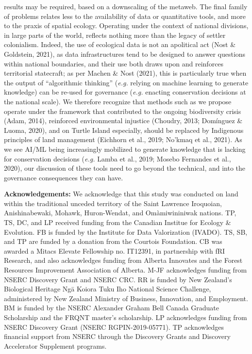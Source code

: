 \documentclass[10pt,oneside]{article}
\begin{document}
results may be required, based on a downscaling of the metaweb. The
final family of problems relates less to the availability of data or
quantitative tools, and more to the praxis of spatial ecology. Operating
under the context of national divisions, in large parts of the world,
reflects nothing more than the legacy of settler colonialism. Indeed,
the use of ecological data is not an apolitical act (Nost \& Goldstein,
2021), as data infrastructures tend to be designed to answer questions
within national boundaries, and their use both draws upon and reinforces
territorial statecraft; as per Machen \& Nost (2021), this is
particularly true when the output of ``algorithmic thinking''
(\emph{e.g.} relying on machine learning to generate knowledge) can be
re-used for governance (\emph{e.g.} enacting conservation decisions at
the national scale). We therefore recognize that methods such as we
propose operate under the framework that contributed to the ongoing
biodiversity crisis (Adam, 2014), reinforced environmental injustice
(Choudry, 2013; Domínguez \& Luoma, 2020), and on Turtle Island
especially, should be replaced by Indigenous principles of land
management (Eichhorn et al., 2019; No'kmaq et al., 2021). As we see
AI/ML being increasingly mobilized to generate knowledge that is lacking
for conservation decisions (\emph{e.g.} Lamba et al., 2019; Mosebo
Fernandes et al., 2020), our discussion of these tools need to go beyond
the technical, and into the governance consequences they can have.

\textbf{Acknowledgements:} We acknowledge that this study was conducted
on land within the traditional unceded territory of the Saint Lawrence
Iroquoian, Anishinabewaki, Mohawk, Huron-Wendat, and Omàmiwininiwak
nations. TP, TS, DC, and LP received funding from the Canadian Institue
for Ecology \& Evolution. FB is funded by the Institute for Data
Valorization (IVADO). TS, SB, and TP are funded by a donation from the
Courtois Foundation. CB was awarded a Mitacs Elevate Fellowship no.
IT12391, in partnership with fRI Research, and also acknowledges funding
from Alberta Innovates and the Forest Resources Improvement Association
of Alberta. M-JF acknowledges funding from NSERC Discovery Grant and
NSERC CRC. RR is funded by New Zealand's Biological Heritage Ngā Koiora
Tuku Iho National Science Challenge, administered by New Zealand
Ministry of Business, Innovation, and Employment. BM is funded by the
NSERC Alexander Graham Bell Canada Graduate Scholarship and the FRQNT
master's scholarship. LP acknowledges funding from NSERC Discovery Grant
(NSERC RGPIN-2019-05771). TP acknowledges financial support from NSERC
through the Discovery Grants and Discovery Accelerator Supplement
programs.
\end{document}
